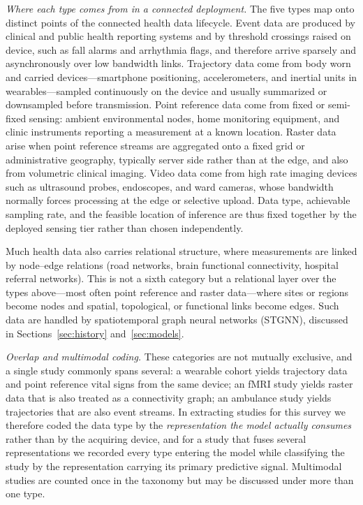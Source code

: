 \documentclass[journal]{IEEEtran}
\begin{document}
\emph{Where each type comes from in a connected deployment.} The five types map onto distinct points of the connected health data lifecycle. Event data are produced by clinical and public health reporting systems and by threshold crossings raised on device, such as fall alarms and arrhythmia flags, and therefore arrive sparsely and asynchronously over low bandwidth links. Trajectory data come from body worn and carried devices---smartphone positioning, accelerometers, and inertial units in wearables---sampled continuously on the device and usually summarized or downsampled before transmission. Point reference data come from fixed or semi-fixed sensing: ambient environmental nodes, home monitoring equipment, and clinic instruments reporting a measurement at a known location. Raster data arise when point reference streams are aggregated onto a fixed grid or administrative geography, typically server side rather than at the edge, and also from volumetric clinical imaging. Video data come from high rate imaging devices such as ultrasound probes, endoscopes, and ward cameras, whose bandwidth normally forces processing at the edge or selective upload. Data type, achievable sampling rate, and the feasible location of inference are thus fixed together by the deployed sensing tier rather than chosen independently.

Much health data also carries relational structure, where measurements are linked by node--edge relations (road networks, brain functional connectivity, hospital referral networks). This is not a sixth category but a relational layer over the types above---most often point reference and raster data---where sites or regions become nodes and spatial, topological, or functional links become edges. Such data are handled by spatiotemporal graph neural networks (STGNN), discussed in Sections~\ref{sec:history} and~\ref{sec:models}.

\emph{Overlap and multimodal coding.} These categories are not mutually exclusive, and a single study commonly spans several: a wearable cohort yields trajectory data and point reference vital signs from the same device; an fMRI study yields raster data that is also treated as a connectivity graph; an ambulance study yields trajectories that are also event streams. In extracting studies for this survey we therefore coded the data type by the \emph{representation the model actually consumes} rather than by the acquiring device, and for a study that fuses several representations we recorded every type entering the model while classifying the study by the representation carrying its primary predictive signal. Multimodal studies are counted once in the taxonomy but may be discussed under more than one type.
\end{document}
